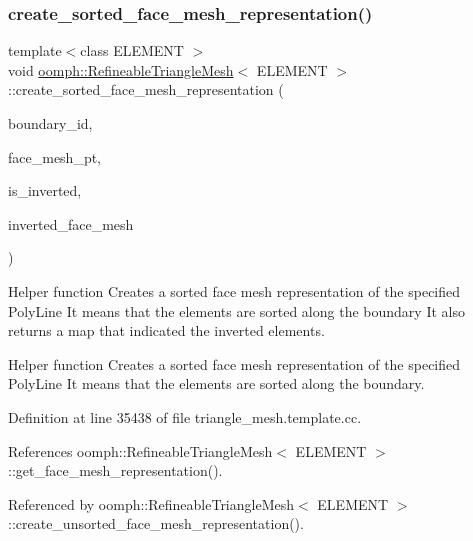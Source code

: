 \subsubsection{\texorpdfstring{create\+\_\+sorted\+\_\+face\+\_\+mesh\+\_\+representation()}{create\_sorted\_face\_mesh\_representation()}}
{\footnotesize\ttfamily template$<$class E\+L\+E\+M\+E\+NT $>$ \\
void \hyperlink{classoomph_1_1RefineableTriangleMesh}{oomph\+::\+Refineable\+Triangle\+Mesh}$<$ E\+L\+E\+M\+E\+NT $>$\+::create\+\_\+sorted\+\_\+face\+\_\+mesh\+\_\+representation (\begin{DoxyParamCaption}\item[{const unsigned \&}]{boundary\+\_\+id,  }\item[{Mesh $\ast$}]{face\+\_\+mesh\+\_\+pt,  }\item[{std\+::map$<$ Finite\+Element $\ast$, bool $>$ \&}]{is\+\_\+inverted,  }\item[{bool \&}]{inverted\+\_\+face\+\_\+mesh }\end{DoxyParamCaption})\hspace{0.3cm}{\ttfamily [protected]}}



Helper function Creates a sorted face mesh representation of the specified Poly\+Line It means that the elements are sorted along the boundary It also returns a map that indicated the inverted elements. 

Helper function Creates a sorted face mesh representation of the specified Poly\+Line It means that the elements are sorted along the boundary. 

Definition at line 35438 of file triangle\+\_\+mesh.\+template.\+cc.



References oomph\+::\+Refineable\+Triangle\+Mesh$<$ E\+L\+E\+M\+E\+N\+T $>$\+::get\+\_\+face\+\_\+mesh\+\_\+representation().



Referenced by oomph\+::\+Refineable\+Triangle\+Mesh$<$ E\+L\+E\+M\+E\+N\+T $>$\+::create\+\_\+unsorted\+\_\+face\+\_\+mesh\+\_\+representation().

\mbox{\label{classoomph_1_1RefineableTriangleMesh_aa0d2608c4671777754eb84c5083c9fcb}} 
